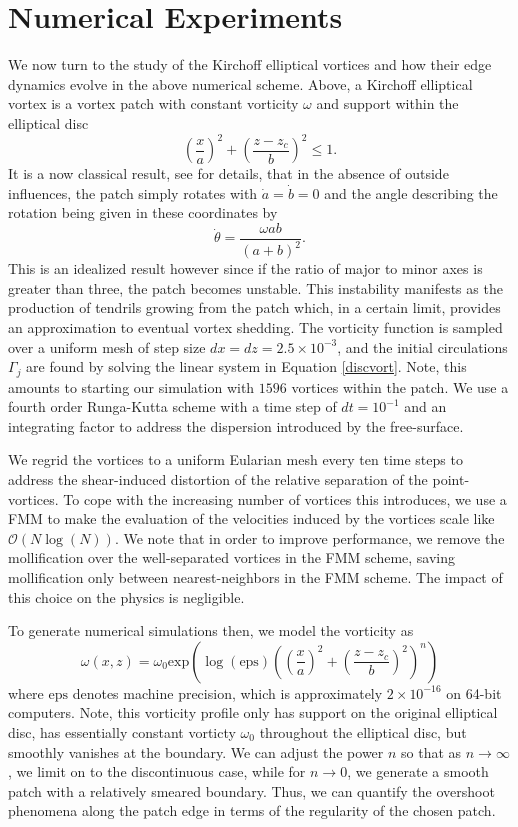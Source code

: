 \documentclass[a4paper,11pt]{article}
\begin{document}
\section*{Numerical Experiments}
We now turn to the study of the Kirchoff elliptical vortices \cite{mitchell,crosby} and how their edge dynamics evolve in the above numerical scheme.  Above, a Kirchoff elliptical vortex is a vortex patch with constant vorticity $\omega$ and support within the elliptical disc
\[
\left(\frac{x}{a}\right)^{2} + \left(\frac{z-z_{c}}{b} \right)^{2} \leq 1.
\]
It is a now classical result, see \cite{mitchell} for details, that in the absence of outside influences, the patch simply rotates with $\dot{a}=\dot{b}=0$ and the angle describing the rotation being given in these coordinates by 
\[
\dot{\theta} = \frac{\omega ab}{(a+b)^{2}}.
\]
This is an idealized result however since if the ratio of major to minor axes is greater than three, the patch becomes unstable.  This instability manifests as the production of tendrils growing from the patch which, in a certain limit, provides an approximation to eventual vortex shedding.  The vorticity function is sampled over a uniform mesh of step size $dx = dz = 2.5 \times 10^{-3}$, and the initial circulations $\Gamma_{j}$ are found by solving the linear system in Equation \eqref{discvort}.  Note, this amounts to starting our simulation with $1596$ vortices within the patch.  We use a fourth order Runga-Kutta scheme with a time step of $dt = 10^{-1}$ and an integrating factor to address the dispersion introduced by the free-surface.  

We regrid the vortices to a uniform Eularian mesh every ten time steps to address the shear-induced distortion of the relative separation of the point-vortices.  To cope with the increasing number of vortices this introduces, we use a FMM to make the evaluation of the velocities induced by the vortices scale like $\mathcal{O}(N\log(N))$.  We note that in order to improve performance, we remove the mollification over the well-separated vortices in the FMM scheme, saving mollification only between nearest-neighbors in the FMM scheme.  The impact of this choice on the physics is negligible.  

To generate numerical simulations then, we model the vorticity as 
\[
\omega(x,z) = \omega_{0}\mbox{exp}\left(\log(\mbox{eps}) \left(\left(\frac{x}{a}\right)^{2} + \left(\frac{z-z_{c}}{b} \right)^{2}\right)^{n}\right)
\]
where $\mbox{eps}$ denotes machine precision, which is approximately $2\times 10^{-16}$ on 64-bit computers.  Note, this vorticity profile only has support on the original elliptical disc, has essentially constant vorticty $\omega_{0}$ throughout the elliptical disc, but smoothly vanishes at the boundary.  We can adjust the power $n$ so that as $n\rightarrow \infty$, we limit on to the discontinuous case, while for $n\rightarrow 0$, we generate a smooth patch with a relatively smeared boundary.  Thus, we can quantify the overshoot phenomena along the patch edge in terms of the regularity of the chosen patch.  
\end{document}
